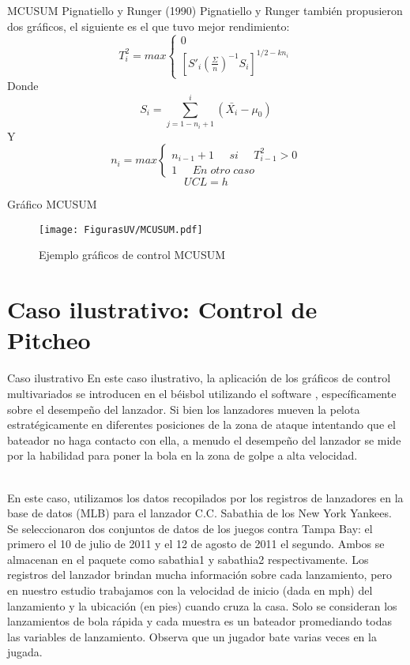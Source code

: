 \documentclass[10pt]{beamer}
\begin{document}
\begin{frame}{MCUSUM Pignatiello y Runger (1990)}
Pignatiello y Runger también propusieron dos gráficos, el siguiente es el que tuvo mejor rendimiento:
\begin{equation*}
T_i^2=max\left\{
\begin{aligned}
0 \\
\left[S'_i\left(\frac{\Sigma}{n}\right)^{-1}S_i\right]^{1/2-kn_i}
\end{aligned}
\right.
\end{equation*}
Donde
$$S_i=\sum\limits_{j=1-n_i+1}^{i}(\bar{X_i}-\mu_0)$$
Y
\begin{equation*}
n_i=max\left\{
\begin{aligned}
n_{i-1}+1 \;\;\;\;\; si \;\;\;\;\;  T^2_{i-1}>0 \\
1 \;\;\;\;\; En\; otro\; caso
\end{aligned}
\right.
\end{equation*}
$$UCL=h$$
\end{frame}

\begin{frame}{Gráfico MCUSUM}
\begin{figure}[h!]
  \centering
  \texttt{[image: FigurasUV/MCUSUM.pdf]}
  \caption{Ejemplo gráficos de control MCUSUM}
\end{figure}
\end{frame}

\section{Caso ilustrativo: Control de Pitcheo}
\begin{frame}{Caso ilustrativo}
En este caso ilustrativo, la aplicación de los gráficos de control multivariados se introducen en el béisbol utilizando el software \cite{R}, específicamente sobre el desempeño del lanzador. Si bien los lanzadores mueven la pelota estratégicamente en diferentes posiciones de la zona de ataque intentando que el bateador no haga contacto con ella, a menudo el desempeño del lanzador se mide por la habilidad para poner la bola en la zona de golpe a alta velocidad.

~\\En este caso, utilizamos los datos recopilados por los registros de lanzadores en la base de datos (MLB) para el lanzador C.C. Sabathia de los New York Yankees. Se seleccionaron dos conjuntos de datos de los juegos contra Tampa Bay: el primero el 10 de julio de 2011 y el 12 de agosto de 2011 el segundo. Ambos se almacenan en el paquete \cite{R1} como sabathia1 y sabathia2 respectivamente. Los registros del lanzador brindan mucha información sobre cada lanzamiento, pero en nuestro estudio trabajamos con la velocidad de inicio (dada en mph) del lanzamiento y la ubicación (en pies) cuando cruza la casa. Solo se consideran los lanzamientos de bola rápida y cada muestra es un bateador promediando todas las variables de lanzamiento. Observa que un jugador bate varias veces en la jugada.
\end{frame}
\end{document}
